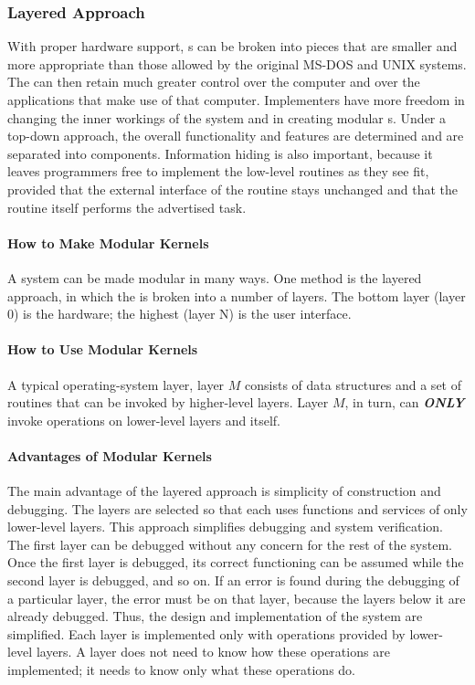 \subsubsection{Layered Approach}\label{subsubsec:Layered_Approach}
With proper hardware support, s can be broken into pieces that are smaller and more appropriate than those allowed by the original MS-DOS and UNIX systems.
The  can then retain much greater control over the computer and over the applications that make use of that computer.
Implementers have more freedom in changing the inner workings of the system and in creating modular s.
Under a top-down approach, the overall functionality and features are determined and are separated into components.
Information hiding is also important, because it leaves programmers free to implement the low-level routines as they see fit, provided that the external interface of the routine stays unchanged and that the routine itself performs the advertised task.

\paragraph{How to Make Modular Kernels}\label{par:How_Make_Modular_Kernels}
A system can be made modular in many ways.
One method is the layered approach, in which the  is broken into a number of layers.
The bottom layer (layer 0) is the hardware; the highest (layer N) is the user interface.

\paragraph{How to Use Modular Kernels}\label{par:How_Use_Modular_Kernels}
A typical operating-system layer, layer $M$ consists of data structures and a set of routines that can be invoked by higher-level layers.
Layer $M$, in turn, can \textbf{\emph{ONLY}} invoke operations on lower-level layers and itself.

\paragraph{Advantages of Modular Kernels}\label{par:Modular_Kernels_Advantages}
The main advantage of the layered approach is simplicity of construction and debugging.
The layers are selected so that each uses functions and services of only lower-level layers.
This approach simplifies debugging and system verification.
The first layer can be debugged without any concern for the rest of the system.
Once the first layer is debugged, its correct functioning can be assumed while the second layer is debugged, and so on.
If an error is found during the debugging of a particular layer, the error must be on that layer, because the layers below it are already debugged.
Thus, the design and implementation of the system are simplified.
Each layer is implemented only with operations provided by lower-level layers.
A layer does not need to know how these operations are implemented; it needs to know only what these operations do.


